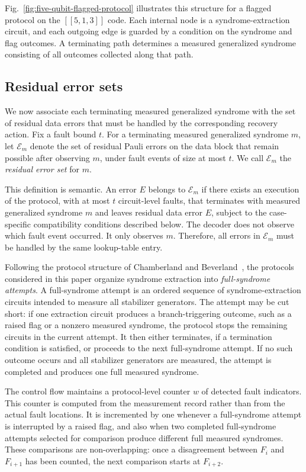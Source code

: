 \documentclass[acmsmall,screen,review,anonymous,nonacm]{acmart}
\begin{document}
Fig.~\ref{fig:five-qubit-flagged-protocol} illustrates this structure for a flagged protocol on the $[[5,1,3]]$ code. Each internal node is a syndrome-extraction circuit, and each outgoing edge is guarded by a condition on the syndrome and flag outcomes. A terminating path determines a measured generalized syndrome consisting of all outcomes collected along that path.

\subsection{Residual error sets}
We now associate each terminating measured generalized syndrome with the set of residual data errors that must be handled by the corresponding recovery action. Fix a fault bound $t$. For a terminating measured generalized syndrome $m$, let $\mathcal{E}_m$ denote the set of residual Pauli errors on the data block that remain possible after observing $m$, under fault events of size at most $t$. We call $\mathcal{E}_m$ the \emph{residual error set} for $m$.

This definition is semantic. An error $E$ belongs to $\mathcal{E}_m$ if there exists an execution of the protocol, with at most $t$ circuit-level faults, that terminates with measured generalized syndrome $m$ and leaves residual data error $E$, subject to the case-specific compatibility conditions described below. The decoder does not observe which fault event occurred. It only observes $m$. Therefore, all errors in $\mathcal{E}_m$ must be handled by the same lookup-table entry.

Following the protocol structure of Chamberland and Beverland~\cite{CB18}, the protocols considered in this paper organize syndrome extraction into \emph{full-syndrome attempts}. A full-syndrome attempt is an ordered sequence of syndrome-extraction circuits intended to measure all stabilizer generators. The attempt may be cut short: if one extraction circuit produces a branch-triggering outcome, such as a raised flag or a nonzero measured syndrome, the protocol stops the remaining circuits in the current attempt. It then either terminates, if a termination condition is satisfied, or proceeds to the next full-syndrome attempt. If no such outcome occurs and all stabilizer generators are measured, the attempt is completed and produces one full measured syndrome.

The control flow maintains a protocol-level counter $w$ of detected fault indicators. This counter is computed from the measurement record rather than from the actual fault locations. It is incremented by one whenever a full-syndrome attempt is interrupted by a raised flag, and also when two completed full-syndrome attempts selected for comparison produce different full measured syndromes. These comparisons are non-overlapping: once a disagreement between $F_i$ and $F_{i+1}$ has been counted, the next comparison starts at $F_{i+2}$.
\end{document}
